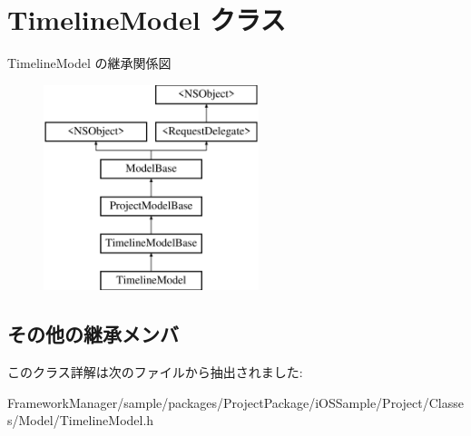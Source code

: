 \hypertarget{interface_timeline_model}{}\section{Timeline\+Model クラス}
\label{interface_timeline_model}
Timeline\+Model の継承関係図\begin{figure}[H]
\begin{center}
\leavevmode
\includegraphics[height=6.000000cm]{interface_timeline_model}
\end{center}
\end{figure}
\subsection*{その他の継承メンバ}


このクラス詳解は次のファイルから抽出されました\+:\begin{DoxyCompactItemize}
\item 
Framework\+Manager/sample/packages/\+Project\+Package/i\+O\+S\+Sample/\+Project/\+Classes/\+Model/Timeline\+Model.\+h\end{DoxyCompactItemize}
